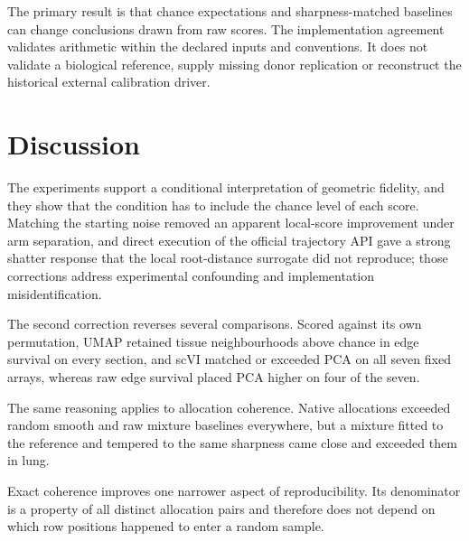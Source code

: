 \documentclass[11pt]{article}
\begin{document}
The primary result is that chance expectations and sharpness-matched baselines can change conclusions drawn from raw scores. The implementation agreement validates arithmetic within the declared inputs and conventions. It does not validate a biological reference, supply missing donor replication or reconstruct the historical external calibration driver.

































\section{Discussion}
The experiments support a conditional interpretation of geometric fidelity, and they show that the condition has to include the chance level of each score. Matching the starting noise removed an apparent local-score improvement under arm separation, and direct execution of the official trajectory API gave a strong shatter response that the local root-distance surrogate did not reproduce; those corrections address experimental confounding and implementation misidentification.

The second correction reverses several comparisons. Scored against its own permutation, UMAP retained tissue neighbourhoods above chance in edge survival on every section, and scVI matched or exceeded PCA on all seven fixed arrays, whereas raw edge survival placed PCA higher on four of the seven.

The same reasoning applies to allocation coherence. Native allocations exceeded random smooth and raw mixture baselines everywhere, but a mixture fitted to the reference and tempered to the same sharpness came close and exceeded them in lung.

Exact coherence improves one narrower aspect of reproducibility. Its denominator is a property of all distinct allocation pairs and therefore does not depend on which row positions happened to enter a random sample.
\end{document}

